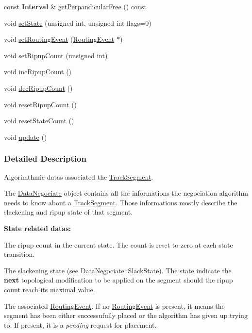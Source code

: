 \begin{DoxyCompactItemize}
\item 
const \textbf{ Interval} \& \mbox{\hyperlink{classKite_1_1DataNegociate_a60d12d642a8d232241a2b07febeb980b}{get\+Perpandicular\+Free}} () const
\item 
void \mbox{\hyperlink{classKite_1_1DataNegociate_aafc8cd0dcd351625a12904bed7d5a7d1}{set\+State}} (unsigned int, unsigned int flags=0)
\item 
void \mbox{\hyperlink{classKite_1_1DataNegociate_a044867f105053d6231ab13fee23ec7b0}{set\+Routing\+Event}} (\mbox{\hyperlink{classKite_1_1RoutingEvent}{Routing\+Event}} $\ast$)
\item 
void \mbox{\hyperlink{classKite_1_1DataNegociate_a45492835bdca93f4e656dcd7ed027825}{set\+Ripup\+Count}} (unsigned int)
\item 
void \mbox{\hyperlink{classKite_1_1DataNegociate_ae50c33d207171246319e11e0671bc706}{inc\+Ripup\+Count}} ()
\item 
void \mbox{\hyperlink{classKite_1_1DataNegociate_a4f94572b3541ea2d150c75bedc8364ed}{dec\+Ripup\+Count}} ()
\item 
void \mbox{\hyperlink{classKite_1_1DataNegociate_a00a11ad9089d2df7b290615921e0c96a}{reset\+Ripup\+Count}} ()
\item 
void \mbox{\hyperlink{classKite_1_1DataNegociate_af1e8d229bb1dfcff3151d44d42a8549b}{reset\+State\+Count}} ()
\item 
void \mbox{\hyperlink{classKite_1_1DataNegociate_ac5c54df7ed3b930268c8d7752c101725}{update}} ()
\end{DoxyCompactItemize}


\subsubsection{Detailed Description}
Algorimthmic datas associated the \mbox{\hyperlink{classKite_1_1TrackSegment}{Track\+Segment}}. 

The \mbox{\hyperlink{classKite_1_1DataNegociate}{Data\+Negociate}} object contains all the informations the negociation algorithm needs to know about a \mbox{\hyperlink{classKite_1_1TrackSegment}{Track\+Segment}}. Those informations mostly describe the slackening and ripup state of that segment.

{\bfseries State related datas\+:}
\begin{DoxyItemize}
\item The ripup count in the current state. The count is reset to zero at each state transition.
\item The slackening state (see \mbox{\hyperlink{classKite_1_1DataNegociate_ab7ccb6fc1f298728995250a3bbcf18c7}{Data\+Negociate\+::\+Slack\+State}}). The state indicate the {\bfseries next} topological modification to be applied on the segment should the ripup count reach it\textquotesingle{}s maximal value.
\item The associated \mbox{\hyperlink{classKite_1_1RoutingEvent}{Routing\+Event}}. If no \mbox{\hyperlink{classKite_1_1RoutingEvent}{Routing\+Event}} is present, it means the segment has been either successufully placed or the algorithm has given up trying to. If present, it is a {\itshape pending} request for placement.
\end{DoxyItemize}

